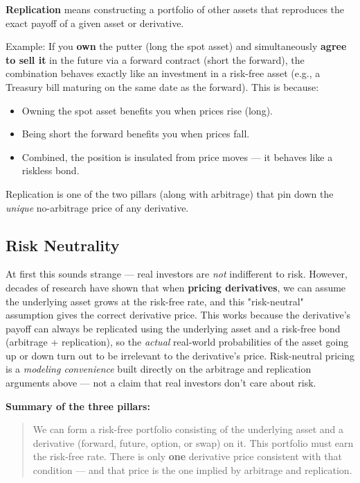 \documentclass[12pt,openany]{book}
\theoremstyle{definition}
\theoremstyle{remark}
\begin{document}
\textbf{Replication} means constructing a portfolio of other assets that reproduces the exact payoff of a given asset or derivative.

Example: If you \textbf{own} the putter (long the spot asset) and simultaneously \textbf{agree to sell it} in the future via a forward contract (short the forward), the combination behaves exactly like an investment in a risk-free asset (e.g., a Treasury bill maturing on the same date as the forward). This is because:
\begin{itemize}
\item Owning the spot asset benefits you when prices rise (long).
\item Being short the forward benefits you when prices fall.
\item Combined, the position is insulated from price moves — it behaves like a riskless bond.
\end{itemize}
Replication is one of the two pillars (along with arbitrage) that pin down the \emph{unique} no-arbitrage price of any derivative.

\subsection{Risk Neutrality}

At first this sounds strange — real investors are \emph{not} indifferent to risk. However, decades of research have shown that when \textbf{pricing derivatives}, we can assume the underlying asset grows at the risk-free rate, and this "risk-neutral" assumption gives the correct derivative price. This works because the derivative's payoff can always be replicated using the underlying asset and a risk-free bond (arbitrage + replication), so the \emph{actual} real-world probabilities of the asset going up or down turn out to be irrelevant to the derivative's price. Risk-neutral pricing is a \emph{modeling convenience} built directly on the arbitrage and replication arguments above — not a claim that real investors don't care about risk.

\textbf{Summary of the three pillars:}
\begin{quote}
We can form a risk-free portfolio consisting of the underlying asset and a derivative (forward, future, option, or swap) on it. This portfolio must earn the risk-free rate. There is only \textbf{one} derivative price consistent with that condition — and that price is the one implied by arbitrage and replication.
\end{quote}
\end{document}
